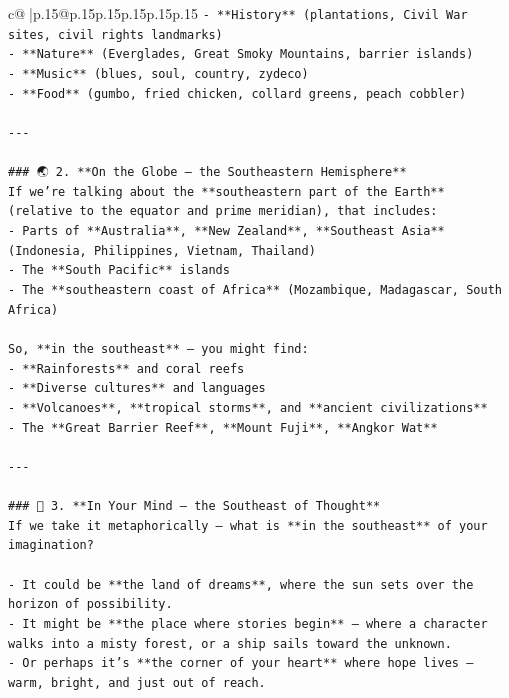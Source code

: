\documentclass{article}
\begin{document}
{\begin{supertabular}{c@{$\;$}|p{.15\linewidth}@{}p{.15\linewidth}p{.15\linewidth}p{.15\linewidth}p{.15\linewidth}p{.15\linewidth}}
{{{\texttt{{-} **History** (plantations, Civil War sites, civil rights landmarks)} \\
\texttt{{-} **Nature** (Everglades, Great Smoky Mountains, barrier islands)} \\
\texttt{{-} **Music** (blues, soul, country, zydeco)} \\
\texttt{{-} **Food** (gumbo, fried chicken, collard greens, peach cobbler)} \\
\\ 
\texttt{{-}{-}{-}} \\
\\ 
\texttt{\#\#\# 🌏 2. **On the Globe — the Southeastern Hemisphere**} \\
\texttt{If we’re talking about the **southeastern part of the Earth** (relative to the equator and prime meridian), that includes:} \\
\texttt{{-} Parts of **Australia**, **New Zealand**, **Southeast Asia** (Indonesia, Philippines, Vietnam, Thailand)} \\
\texttt{{-} The **South Pacific** islands} \\
\texttt{{-} The **southeastern coast of Africa** (Mozambique, Madagascar, South Africa)} \\
\\ 
\texttt{So, **in the southeast** — you might find:} \\
\texttt{{-} **Rainforests** and coral reefs} \\
\texttt{{-} **Diverse cultures** and languages} \\
\texttt{{-} **Volcanoes**, **tropical storms**, and **ancient civilizations**} \\
\texttt{{-} The **Great Barrier Reef**, **Mount Fuji**, **Angkor Wat**} \\
\\ 
\texttt{{-}{-}{-}} \\
\\ 
\texttt{\#\#\# 🧠 3. **In Your Mind — the Southeast of Thought**} \\
\texttt{If we take it metaphorically — what is **in the southeast** of your imagination?} \\
\\ 
\texttt{{-} It could be **the land of dreams**, where the sun sets over the horizon of possibility.} \\
\texttt{{-} It might be **the place where stories begin** — where a character walks into a misty forest, or a ship sails toward the unknown.} \\
\texttt{{-} Or perhaps it’s **the corner of your heart** where hope lives — warm, bright, and just out of reach.} \\
}}}
\end{supertabular}}
\end{document}
